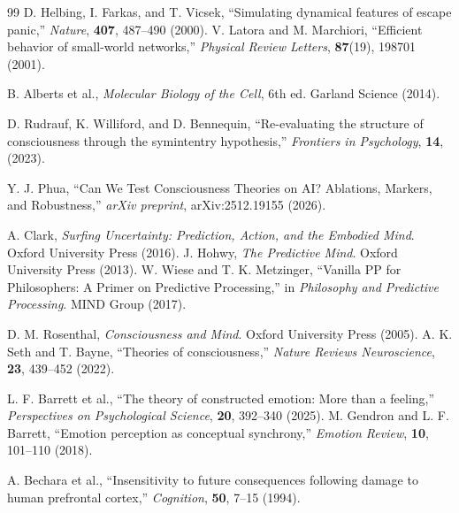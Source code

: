 \documentclass[12pt,a4paper]{article}
\begin{document}
\begin{thebibliography}{99}
		 D. Helbing, I. Farkas, and T. Vicsek, ``Simulating dynamical features of escape panic,'' \emph{Nature}, \textbf{407}, 487--490 (2000).
		 V. Latora and M. Marchiori, ``Efficient behavior of small-world networks,'' \emph{Physical Review Letters}, \textbf{87}(19), 198701 (2001).
		
		 B. Alberts et al., \emph{Molecular Biology of the Cell}, 6th ed. Garland Science (2014).
		
		 D. Rudrauf, K. Williford, and D. Bennequin, ``Re-evaluating the structure of consciousness through the symintentry hypothesis,'' \emph{Frontiers in Psychology}, \textbf{14}, (2023).
		
		 Y. J. Phua, ``Can We Test Consciousness Theories on AI? Ablations, Markers, and Robustness,'' \emph{arXiv preprint}, arXiv:2512.19155 (2026).
		
		 A. Clark, \emph{Surfing Uncertainty: Prediction, Action, and the Embodied Mind}. Oxford University Press (2016).
		 J. Hohwy, \emph{The Predictive Mind}. Oxford University Press (2013).
		 W. Wiese and T. K. Metzinger, ``Vanilla PP for Philosophers: A Primer on Predictive Processing,'' in \emph{Philosophy and Predictive Processing}. MIND Group (2017).
		
		 D. M. Rosenthal, \emph{Consciousness and Mind}. Oxford University Press (2005).
		 A. K. Seth and T. Bayne, ``Theories of consciousness,'' \emph{Nature Reviews Neuroscience}, \textbf{23}, 439--452 (2022).
		
		 L. F. Barrett et al., ``The theory of constructed emotion: More than a feeling,'' \emph{Perspectives on Psychological Science}, \textbf{20}, 392--340 (2025).
		 M. Gendron and L. F. Barrett, ``Emotion perception as conceptual synchrony,'' \emph{Emotion Review}, \textbf{10}, 101--110 (2018).
		
		 A. Bechara et al., ``Insensitivity to future consequences following damage to human prefrontal cortex,'' \emph{Cognition}, \textbf{50}, 7--15 (1994).
		

\end{thebibliography}
\end{document}
